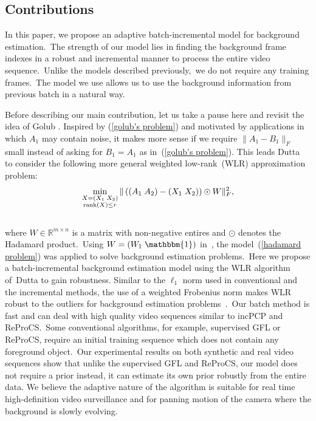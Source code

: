 \documentclass[10pt,twocolumn,letterpaper]{article}
\begin{document}
\subsection{Contributions}
\vspace{-0.0in}
In this paper, we propose an adaptive batch-incremental model for background estimation.~The strength of our model lies in finding the background frame indexes in a robust and incremental manner to process the entire video sequence.~Unlike the models described previously,~we do not require any training frames.~The model we use allows us to use the background information from previous batch in a natural way.

Before describing our main contribution, let us take a pause here and revisit the idea of Golub \etal.
Inspired by (\ref{golub's problem}) and motivated by applications in which $A_1$ may contain noise, it makes more sense if we require $\|A_1-B_1\|_F$ small instead of asking for $B_1=A_1$ as in~(\ref{golub's problem}). This leads Dutta \etal~\cite{duttali_acl,duttali,duttali_bg} to consider the following more general weighted low-rank~(WLR) approximation problem:
~\\[-0.2in]
\begin{eqnarray}\label{hadamard problem}
\min_{\substack{X=(X_1\;X_2)\\{\rm rank}(X)\le r}}\|\left((A_1\;A_2)-(X_1\;X_2)\right)\odot W\|_F^2,
\end{eqnarray}
~\\[-0.1in]
where $W\in\mathbb{R}^{m\times n}$ is a matrix with non-negative entires and $\odot$ denotes the Hadamard product.~Using $W=(W_1\;\mathbbm{1})$ in~\cite{duttali_acl}, the model~(\ref{hadamard problem}) was applied to solve background estimation problems.~Here we propose a batch-incremental background estimation model using the WLR algorithm of~Dutta \etal to gain robustness. Similar to the $\ell_1$ norm used in conventional and the incremental methods, the use of a weighted Frobenius norm makes WLR robust to the outliers for background estimation problems~\cite{duttali_acl,duttali_bg}.~Our batch method is fast and can deal with high quality video sequences similar to incPCP and ReProCS.~Some conventional algorithms, for example, supervised GFL or ReProCS, require an initial training sequence which does not contain any foreground object.~Our experimental results on both synthetic and real video sequences show that unlike the supervised GFL and ReProCS, our model does not require a prior instead, it can estimate its own prior robustly from the entire data. We believe the adaptive nature of the algorithm is suitable for real time high-definition video surveillance and for panning motion of the camera where the background is slowly evolving.
\end{document}

